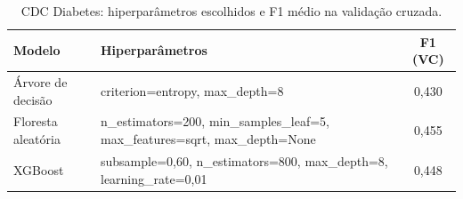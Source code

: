 \begin{table}[!t]
\centering
\caption{CDC Diabetes: hiperparâmetros escolhidos e F1 médio na validação cruzada.}
\label{tab:cdc_hiper}
\begin{tabular}{llc}
\hline
Modelo & Hiperparâmetros & F1 (VC) \\
\hline
Árvore de decisão & criterion=entropy, max\_depth=8 & 0,430 \\
Floresta aleatória & n\_estimators=200, min\_samples\_leaf=5, max\_features=sqrt, max\_depth=None & 0,455 \\
XGBoost & subsample=0,60, n\_estimators=800, max\_depth=8, learning\_rate=0,01 & 0,448 \\
\hline
\end{tabular}
\end{table}